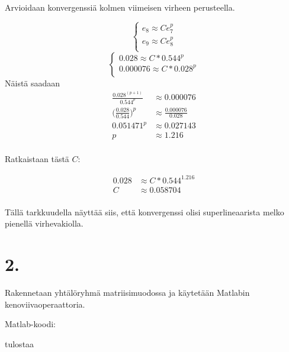 \documentclass{article}
\begin{document}
Arvioidaan konvergenssiä kolmen viimeisen virheen perusteella.

\[
  \begin{cases}
    e_8 \approx Ce_7^p \\
    e_9 \approx Ce_8^p \\
  \end{cases}
\]
\[
  \begin{cases}
    0.028 \approx C*0.544^p \\
    0.000076 \approx C*0.028^p \\
  \end{cases}
\]
Näistä saadaan
\begin{align*}
  \frac{0.028^{(p+1)}}{0.544^p} &\approx 0.000076 \\
  \Big(\frac{0.028}{0.544}\Big)^p &\approx \frac{0.000076}{0.028} \\
  0.051471^p &\approx 0.027143 \\
  p &\approx 1.216 \\
\end{align*}

Ratkaistaan tästä $C$:

\begin{align*}
  0.028 &\approx C*0.544^{1.216} \\
  C &\approx 0.058704 \\
\end{align*}

Tällä tarkkuudella näyttää siis, että konvergenssi olisi superlineaarista
melko pienellä virhevakiolla.

\section*{2.}

Rakennetaan yhtälöryhmä matriisimuodossa ja käytetään Matlabin kenoviivaoperaattoria.

Matlab-koodi:



tulostaa


\end{document}
